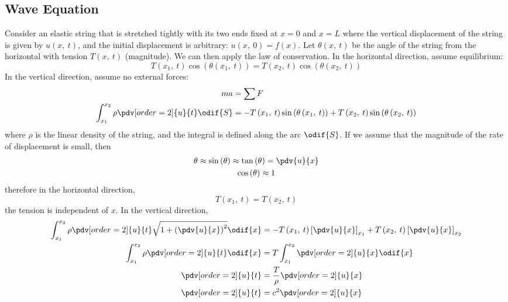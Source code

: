 \documentclass{article}
\begin{document}
\subsection{Wave Equation}
Consider an elastic string that is stretched tightly with its two ends
fixed at \(x = 0\) and \(x = L\) where the vertical displacement of the
string is given by \(u\left( x,\: t \right)\), and the initial
displacement is arbitrary: \(u\left( x,\: 0 \right) = f\left( x
\right)\). Let \(\theta\left( x,\: t \right)\) be the angle of the
string from the horizontal with tension \(T\left( x,\: t \right)\)
(magnitude). We can then apply the law of conservation. In the
horizontal direction, assume equilibrium:
\begin{equation*}
    T\left( x_1,\: t \right) \cos{\left( \theta\left( x_1,\: t \right) \right)} = T\left( x_2,\: t \right) \cos{\left( \theta\left( x_2,\: t \right) \right)}
\end{equation*}
In the vertical direction, assume no external forces:
\begin{align*}
    m a                                                & = \sum F                                                                                                                                                     \\
    \int_{x_1}^{x_2} \rho \pdv[order=2]{u}{t} \odif{S} & = -T\left( x_1,\: t \right) \sin{\left( \theta\left( x_1,\: t \right) \right)} + T\left( x_2,\: t \right) \sin{\left( \theta\left( x_2,\: t \right) \right)}
\end{align*}
where \(\rho\) is the linear density of the string, and the integral is defined along the arc \(\odif{S}\).
If we assume that the magnitude of the rate of displacement is small, then
\begin{gather*}
    \theta \approx \sin{\left( \theta \right)} \approx \tan{\left( \theta \right)} = \pdv{u}{x} \\
    \cos{\left( \theta \right)} \approx 1
\end{gather*}
therefore in the horizontal direction,
\begin{equation*}
    T\left( x_1,\: t \right) = T\left( x_2,\: t \right)
\end{equation*}
the tension is independent of \(x\). In the vertical direction,
\begin{align*}
    \int_{x_1}^{x_2} \rho \pdv[order=2]{u}{t} \sqrt{1 + \left( \pdv{u}{x} \right)^2} \odif{x} & = -T\left( x_1,\: t \right) \left[ \pdv{u}{x} \right]_{x_1} + T\left( x_2,\: t \right) \left[ \pdv{u}{x} \right]_{x_2} \\
    \int_{x_1}^{x_2} \rho \pdv[order=2]{u}{t} \odif{x}                                        & = T \int_{x_1}^{x_2} \pdv[order=2]{u}{x} \odif{x}                                                                      \\
    \pdv[order=2]{u}{t}                                                                       & = \frac{T}{\rho} \pdv[order=2]{u}{x}                                                                                   \\
    \pdv[order=2]{u}{t}                                                                       & = c^2 \pdv[order=2]{u}{x}
\end{align*}
\end{document}
